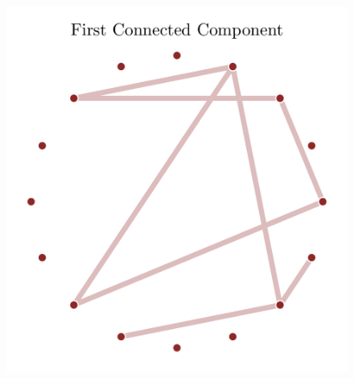 \documentclass[
  letterpaper,
  DIV=11,
  numbers=noendperiod]{scrartcl}
\begin{document}
\begin{figure}
\begin{minipage}{0.33\linewidth}
{\captionsetup{labelsep=none}\includegraphics{figures/graph_decomposition/2/2.png}

}

\subcaption{\label{fig-graph-decomposition2}}

\end{minipage}%
%
\begin{minipage}{0.33\linewidth}

\end{minipage}
\end{figure}
\end{document}
